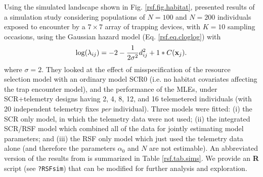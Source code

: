 Using the simulated landscape shown in Fig. \ref{rsf.fig.habitat},
\citet{royle_etal:2012mee} presented results of a simulation study
considering populations of $N=100$ and $N=200$ individuals exposed to
encounter by a 
 $7 \times 7$ array of trapping devices,
with $K=10$ sampling occasions, using 
the Gaussian hazard model
(Eq. \ref{rsf.eq.cloglog})
with 
\[
\log(\lambda_{ij}) = -2  -\frac{1}{2\sigma^{2}} d_{ij}^{2} + 1 * C({\bf x}_{j}).
\]
where $\sigma =2$.
They looked at the effect of misspecification of the resource
selection model with an ordinary model SCR0 (i.e. no habitat
covariates affecting the trap encounter model), and the performance of
the MLEs, under SCR+telemetry designs having 2, 4, 8, 12, and 16
telemetered individuals (with 20 independent telemetry fixes {\it per}
individual). Three models were fitted: (i) the SCR only model, in
which the telemetry data were not used; (ii) the integrated SCR/RSF
model which combined all of the data for jointly estimating model
parameters; and (iii) the RSF only model which just used the telemetry
data alone (and therefore the parameters $\alpha_{0}$ and $N$ are not
estimable).  An abbreviated version of the results from
\citet{royle_etal:2012mee} is summarized in Table \ref{rsf.tab.sims}.
We provide an {\bf R} script (see \mbox{\tt ?RSFsim}) that can
be modified for further analysis and exploration.

